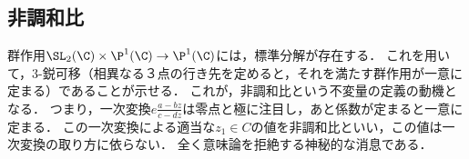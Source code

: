 \documentclass[uplatex, dvipdfmx]{jsreport}
\newcommand{\Pone}{\P^1(\C)}
\begin{document}
\subsection{非調和比}

\begin{tcolorbox}[colframe=ForestGreen, colback=ForestGreen!10!white,breakable,colbacktitle=ForestGreen!40!white,coltitle=black,fonttitle=\bfseries\sffamily,
title=一次変換の式の読み方]
    群作用$\SL_2(\C)\times\Pone\to\Pone$には，標準分解が存在する．
    これを用いて，3-鋭可移（相異なる３点の行き先を定めると，それを満たす群作用が一意に定まる）であることが示せる．
    これが，非調和比という不変量の定義の動機となる．
    つまり，一次変換$e\frac{a-bz}{c-dz}$は零点と極に注目し，あと係数が定まると一意に定まる．
    この一次変換による適当な$z_1\in C$の値を非調和比といい，この値は一次変換の取り方に依らない．
    全く意味論を拒絶する神秘的な消息である．
\end{tcolorbox}
\end{document}
